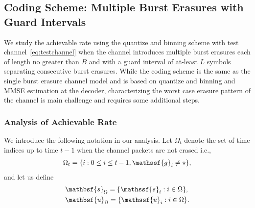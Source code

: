 \documentclass[journal, twocolumn, 10pt]{IEEEtran}
\newcommand{\rvg}{{\mathssf{g}}}    %
\newcommand{\rvs}{{\mathssf{s}}}    %
\newcommand{\rvbs}{{\mathbsf{s}}}
\newcommand{\rvu}{{\mathssf{u}}}    %
\newcommand{\rvbu}{{\mathbsf{u}}}
\newcommand{\bof}[1]{\textbf{#1}}
\begin{document}
{%

\subsection{Coding Scheme: Multiple Burst Erasures with Guard Intervals}
\label{sec:GM_ME}
We study the achievable rate using the quantize and binning scheme with test channel~\eqref{eq:testchannel} when the channel introduces multiple burst erasures each of length no greater than $B$ and with a guard interval of at-least $L$ symbols separating consecutive burst erasures. While the coding scheme is the same as the single burst erasure channel model and is based on quantize and binning and MMSE estimation at the decoder, characterizing the worst case erasure pattern of the channel is main challenge and requires some additional steps.

\subsubsection{Analysis of Achievable Rate}
We introduce the following notation in our analysis.
Let $\Omega_t$ denote the set of time indices up to time $t-1$ when the channel packets are not erased i.e., 
\begin{align}
\Omega_{t} = \{i: 0\le i\le t-1, \rvg_{i} \neq \star\}, \label{eq:Omeg-def}
\end{align} 
and let us define
\begin{align}
& \rvbs_{\Omega} = \{\rvs_{i}:i\in \Omega\},\\
& \rvbu_{\Omega} = \{\rvu_{i}:i\in \Omega\}. 
\end{align}
 
}
\end{document}
